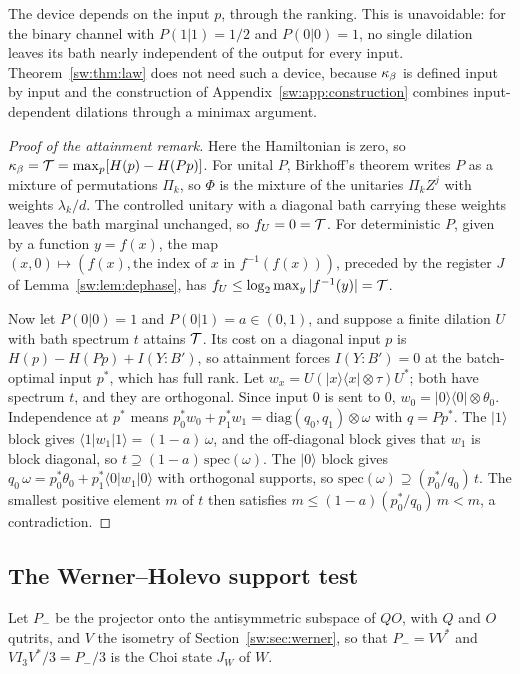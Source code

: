 The device depends on the input $p$, through the ranking. This is unavoidable: for the binary channel with $P(1|1)=1/2$ and $P(0|0)=1$, no single dilation leaves its bath nearly independent of the output for every input. Theorem~\ref{sw:thm:law} does not need such a device, because $\kappa_\beta$ is defined input by input and the construction of Appendix~\ref{sw:app:construction} combines input-dependent dilations through a minimax argument.

\begin{proof}[Proof of the attainment remark]
Here the Hamiltonian is zero, so $\kappa_\beta=\mathcal T=\max_p[H(p)-H(Pp)]$. For unital $P$, Birkhoff's theorem writes $P$ as a mixture of permutations $\Pi_k$, so $\Phi$ is the mixture of the unitaries $\Pi_kZ^j$ with weights $\lambda_k/d$. The controlled unitary with a diagonal bath carrying these weights leaves the bath marginal unchanged, so $f_U=0=\mathcal T$. For deterministic $P$, given by a function $y=f(x)$, the map $(x,0)\mapsto(f(x),\text{the index of }x\text{ in }f^{-1}(f(x)))$, preceded by the register $J$ of Lemma~\ref{sw:lem:dephase}, has $f_U\le\log_2\max_y|f^{-1}(y)|=\mathcal T$.

Now let $P(0|0)=1$ and $P(0|1)=a\in(0,1)$, and suppose a finite dilation $U$ with bath spectrum $t$ attains $\mathcal T$. Its cost on a diagonal input $p$ is $H(p)-H(Pp)+I(Y{:}B')$, so attainment forces $I(Y{:}B')=0$ at the batch-optimal input $p^*$, which has full rank. Let $w_x=U(|x\rangle\langle x|\otimes\tau)U^*$; both have spectrum $t$, and they are orthogonal. Since input $0$ is sent to $0$, $w_0=|0\rangle\langle0|\otimes\theta_0$. Independence at $p^*$ means $p_0^*w_0+p_1^*w_1=\mathrm{diag}(q_0,q_1)\otimes\omega$ with $q=Pp^*$. The $|1\rangle$ block gives $\langle1|w_1|1\rangle=(1-a)\,\omega$, and the off-diagonal block gives that $w_1$ is block diagonal, so $t\supseteq(1-a)\,\mathrm{spec}(\omega)$. The $|0\rangle$ block gives $q_0\,\omega=p_0^*\theta_0+p_1^*\langle0|w_1|0\rangle$ with orthogonal supports, so $\mathrm{spec}(\omega)\supseteq(p_0^*/q_0)\,t$. The smallest positive element $m$ of $t$ then satisfies $m\le(1-a)(p_0^*/q_0)\,m<m$, a contradiction.
\end{proof}

\subsection{The Werner--Holevo support test}\label{sw:app:werner}

Let $P_-$ be the projector onto the antisymmetric subspace of $QO$, with $Q$ and $O$ qutrits, and $V$ the isometry of Section~\ref{sw:sec:werner}, so that $P_-=VV^*$ and $VI_3V^*/3=P_-/3$ is the Choi state $J_W$ of $W$.

